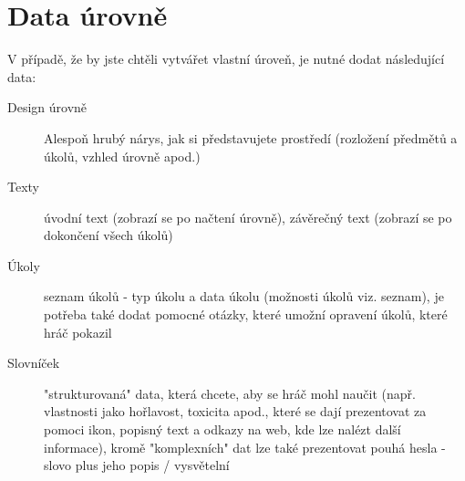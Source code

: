 \documentclass[a4paper,12pt]{article}
\begin{document}
\section{Data úrovně}
V případě, že by jste chtěli vytvářet vlastní úroveň, je nutné dodat následující data:\\
\begin{description}
\item[Design úrovně] Alespoň hrubý nárys, jak si představujete prostředí (rozložení předmětů a úkolů, vzhled úrovně apod.)
\item[Texty] úvodní text (zobrazí se po načtení úrovně), závěrečný text (zobrazí se po dokončení všech úkolů)
\item[Úkoly] seznam úkolů - typ úkolu a data úkolu (možnosti úkolů viz. seznam), je potřeba také dodat pomocné otázky, které umožní opravení úkolů, které hráč pokazil 
\item[Slovníček] "strukturovaná" data, která chcete, aby se hráč mohl naučit (např. vlastnosti jako hořlavost, toxicita apod., které se dají prezentovat za pomoci ikon, popisný text a odkazy na web, kde lze nalézt další informace), kromě "komplexních" dat lze také prezentovat pouhá hesla - slovo plus jeho popis / vysvětelní
\end{description}
\end{document}

